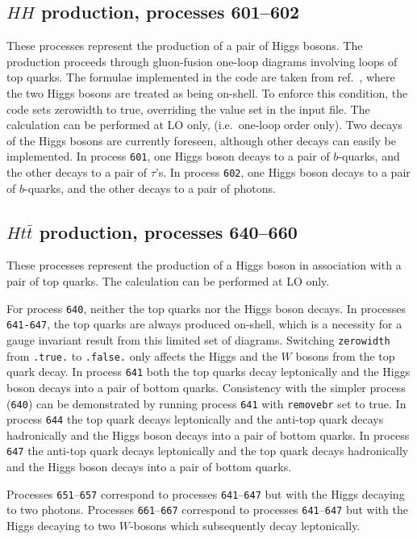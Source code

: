 \subsection{$HH$ production, processes 601--602}
These processes represent the production of a pair of Higgs bosons.
The production proceeds through gluon-fusion one-loop diagrams involving loops 
of top quarks. The formulae implemented in the code are taken from ref.~\cite{Glover:1987nx},
where the two Higgs bosons are treated as being on-shell. To enforce this 
condition, the code sets zerowidth to true, overriding the value set in the input file.
The calculation can be performed at LO only, (i.e.\ one-loop order only).
Two decays of the Higgs bosons are currently foreseen, although other decays can easily be implemented. 
In process {\tt 601}, one Higgs boson decays to
a pair of $b$-quarks, and the other decays to a pair of $\tau$'s.
In process {\tt 602}, one Higgs boson decays to
a pair of $b$-quarks, and the other decays to a pair of photons.

\subsection{$Ht{\bar t}$ production, processes 640--660}
\label{subsec:htt}

These processes represent the production of a Higgs boson in association
with a pair of top quarks. The calculation can be performed at LO only.

For process {\tt 640}, neither the top quarks nor the Higgs boson
decays. 
In processes {\tt 641-647}, the top quarks are always
produced on-shell, which is a necessity for a gauge invariant result
from this limited set of diagrams.
Switching {\tt zerowidth} from {\tt .true.} to {\tt .false.} only affects
the Higgs and the $W$ bosons from the top quark decay.
In process {\tt 641} both the top quarks decay leptonically
and the Higgs boson decays into a pair of bottom quarks. 
Consistency with
the simpler process ({\tt 640}) can be demonstrated by running process
{\tt 641} with {\tt removebr} set to true.
In process {\tt 644} the top quark decays leptonically
and the anti-top quark decays hadronically and the Higgs boson decays into a pair of bottom quarks. 
In process {\tt 647} the anti-top quark decays leptonically
and the top quark decays hadronically and the Higgs boson decays into a pair of bottom quarks. 

Processes {\tt 651}--{\tt 657} correspond to processes {\tt 641}--{\tt 647} but with the Higgs decaying
to two photons.
Processes {\tt 661}--{\tt 667} correspond to processes {\tt 641}--{\tt 647} but with the Higgs decaying
to two $W$-bosons which subsequently decay leptonically.

